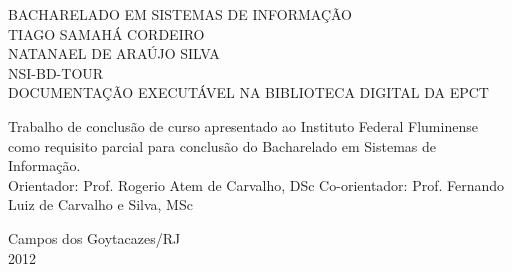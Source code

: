 \begin{titlepage}
 \begin{figure}[ht]
 \centering
 \end{figure}
 \begin{center}
   {\large BACHARELADO EM SISTEMAS DE INFORMAÇÃO} \\ [3.5cm]
   {\large TIAGO SAMAHÁ CORDEIRO} \\
   {\large NATANAEL DE ARAÚJO SILVA} \\ [4cm]
   {\large NSI-BD-TOUR}\\ [0.5cm]
   {\small DOCUMENTAÇÃO EXECUTÁVEL NA BIBLIOTECA DIGITAL DA EPCT} \\ [2cm]
   \hspace{.45\textwidth} %
   \begin{minipage}{0.53\textwidth}
   \begin{espacosimples}
      Trabalho de conclusão de curso apresentado ao Instituto Federal Fluminense como requisito parcial para conclusão do Bacharelado em Sistemas de Informação.\\[1.5cm]
      Orientador: Prof. Rogerio Atem de Carvalho, DSc
      Co-orientador: Prof. Fernando Luiz de Carvalho e Silva, MSc
    \end{espacosimples}
    \end{minipage}
   \vfill
   {\large Campos dos Goytacazes/RJ} \\
   {\large 2012}
 \end{center}
\end{titlepage}